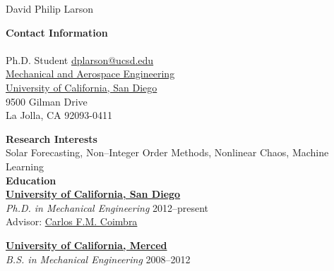 \documentclass[11pt]{article}
\newcommand{\blankline}{\quad\pagebreak[3]}
\providecommand*\email[1]{\href{mailto:#1}{#1}}
\renewcommand{\section}[1]{\textbf{#1}\\}
\renewcommand{\subsection}[1]{\blankline \textbf{#1}}
\begin{document}
David Philip Larson


\section{Contact Information} \\
Ph.D. Student \hfill \email{dplarson@ucsd.edu} \\
\href{http://mae.ucsd.edu/}{Mechanical and Aerospace Engineering} \\
\href{http://ucsd.edu/}{University of California, San Diego} \\
9500 Gilman Drive \\
La Jolla, CA 92093-0411


\section{Research Interests}
Solar Forecasting, Non--Integer Order Methods, Nonlinear Chaos, Machine Learning \\


\section{Education}

\href{http://mae.ucsd.edu/}{\textbf{University of California, San Diego} } \\
\textit{Ph.D. in Mechanical Engineering} \hfill 2012--present \\
Advisor: \href{http://www.jacobsschool.ucsd.edu/faculty/faculty_bios/index.sfe?fmp_recid=324}{Carlos F.M. Coimbra}

\blankline

\subsection{\href{http:/eng.ucmerced.edu/}{University of California, Merced} } \\
\textit{B.S. in Mechanical Engineering} \hfill 2008--2012
\end{document}
